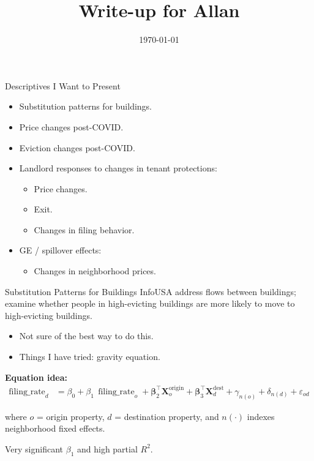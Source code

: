 \documentclass[aspectratio=169]{beamer}
\title{Write-up for Allan}
\date{\today}
\begin{document}


\frame{\titlepage}

\begin{frame}{Descriptives I Want to Present}
\begin{itemize}
  \item Substitution patterns for buildings.
  \item Price changes post-COVID.
  \item Eviction changes post-COVID.
  \item Landlord responses to changes in tenant protections:
    \begin{itemize}
      \item Price changes.
      \item Exit.
      \item Changes in filing behavior.
    \end{itemize}
  \item GE / spillover effects:
    \begin{itemize}
      \item Changes in neighborhood prices.
    \end{itemize}
\end{itemize}
\end{frame}


\begin{frame}{Substitution Patterns for Buildings}
InfoUSA address flows between buildings; examine whether people in high-evicting buildings are more likely to move to high-evicting buildings.
\begin{itemize}
  \item Not sure of the best way to do this.
  \item Things I have tried: gravity equation.
\end{itemize}

\medskip
\textbf{Equation idea:}
\begin{align}
\operatorname{filing\_rate}_{d}
  &= \beta_0 
   + \beta_1\,\operatorname{filing\_rate}_{o}
   + \boldsymbol{\beta}_2^{\top} \mathbf{X}^{\text{origin}}_{o}
   + \boldsymbol{\beta}_3^{\top} \mathbf{X}^{\text{dest}}_{d}
   + \gamma_{n(o)} + \delta_{n(d)} + \varepsilon_{od}
   \label{eq:filing-rate-flows}
\end{align}

{\small where \(o\) = origin property, \(d\) = destination property, and \(n(\cdot)\) indexes neighborhood fixed effects.}

\medskip
Very significant \(\beta_1\) and high partial \(R^2\).
\end{frame}
\end{document}
